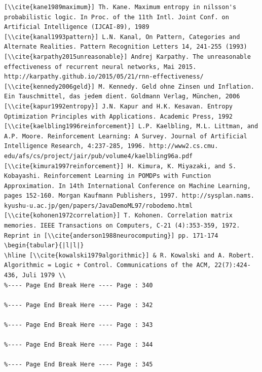 \documentclass[10pt]{book}
\begin{document}
\begin{verbatim}
[\\cite{kane1989maximum}] Th. Kane. Maximum entropy in nilsson's probabilistic logic. In Proc. of the 11th Intl. Joint Conf. on Artificial Intelligence (IJCAI-89), 1989
[\\cite{kanal1993pattern}] L.N. Kanal, On Pattern, Categories and Alternate Realities. Pattern Recognition Letters 14, 241-255 (1993)
[\\cite{karpathy2015unreasonable}] Andrej Karpathy. The unreasonable effectiveness of recurrent neural networks, Mai 2015. http://karpathy.github.io/2015/05/21/rnn-effectiveness/
[\\cite{kennedy2006geld}] M. Kennedy. Geld ohne Zinsen und Inflation. Ein Tauschmittel, das jedem dient. Goldmann Verlag, München, 2006
[\\cite{kapur1992entropy}] J.N. Kapur and H.K. Kesavan. Entropy Optimization Principles with Applications. Academic Press, 1992
[\\cite{kaelbling1996reinforcement}] L.P. Kaelbling, M.L. Littman, and A.P. Moore. Reinforcement Learning: A Survey. Journal of Artificial Intelligence Research, 4:237-285, 1996. http://www2.cs.cmu. edu/afs/cs/project/jair/pub/volume4/kaelbling96a.pdf
[\\cite{kimura1997reinforcement}] H. Kimura, K. Miyazaki, and S. Kobayashi. Reinforcement Learning in POMDPs with Function Approximation. In 14th International Conference on Machine Learning, pages 152-160. Morgan Kaufmann Publishers, 1997. http://sysplan.nams. kyushu-u.ac.jp/gen/papers/JavaDemoML97/robodemo.html
[\\cite{kohonen1972correlation}] T. Kohonen. Correlation matrix memories. IEEE Transactions on Computers, C-21 (4):353-359, 1972. Reprint in [\\cite{anderson1988neurocomputing}] pp. 171-174
\begin{tabular}{|l|l|}
\hline [\\cite{kowalski1979algorithmic}] & R. Kowalski and A. Robert. Algorithmic = Logic + Control. Communications of the ACM, 22(7):424-436, Juli 1979 \\
%---- Page End Break Here ---- Page : 340

%---- Page End Break Here ---- Page : 342

%---- Page End Break Here ---- Page : 343

%---- Page End Break Here ---- Page : 344

%---- Page End Break Here ---- Page : 345


\end{verbatim}
\end{document}
